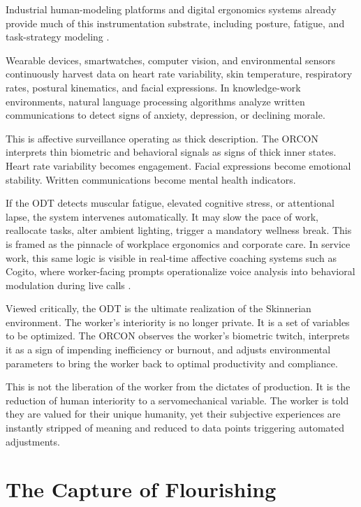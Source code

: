 \documentclass[runningheads]{llncs}
\begin{document}
Industrial human-modeling platforms and digital ergonomics systems already provide much of this instrumentation substrate, including posture, fatigue, and task-strategy modeling \cite{siemensPSXHuman,siemensHumanAdvanced}.

Wearable devices, smartwatches, computer vision, and environmental sensors continuously harvest data on heart rate variability, skin temperature, respiratory rates, postural kinematics, and facial expressions. In knowledge-work environments, natural language processing algorithms analyze written communications to detect signs of anxiety, depression, or declining morale.

This is affective surveillance operating as thick description. The ORCON interprets thin biometric and behavioral signals as signs of thick inner states. Heart rate variability becomes engagement. Facial expressions become emotional stability. Written communications become mental health indicators.

If the ODT detects muscular fatigue, elevated cognitive stress, or attentional lapse, the system intervenes automatically. It may slow the pace of work, reallocate tasks, alter ambient lighting, trigger a mandatory wellness break. This is framed as the pinnacle of workplace ergonomics and corporate care. In service work, this same logic is visible in real-time affective coaching systems such as Cogito, where worker-facing prompts operationalize voice analysis into behavioral modulation during live calls \cite{delagarza2019time,cogito2023businesswire}.

Viewed critically, the ODT is the ultimate realization of the Skinnerian environment. The worker's interiority is no longer private. It is a set of variables to be optimized. The ORCON observes the worker's biometric twitch, interprets it as a sign of impending inefficiency or burnout, and adjusts environmental parameters to bring the worker back to optimal productivity and compliance.

This is not the liberation of the worker from the dictates of production. It is the reduction of human interiority to a servomechanical variable. The worker is told they are valued for their unique humanity, yet their subjective experiences are instantly stripped of meaning and reduced to data points triggering automated adjustments. 

\section{The Capture of Flourishing}
\end{document}
